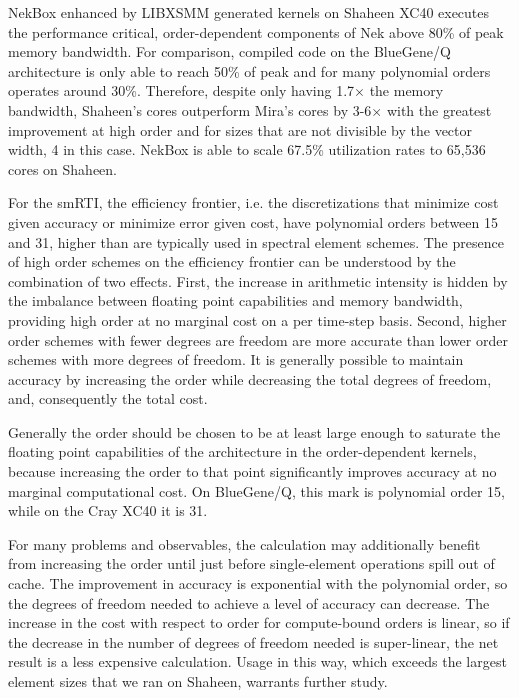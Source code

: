 NekBox enhanced by LIBXSMM generated kernels on Shaheen XC40 executes the performance critical, order-dependent components of Nek above 80\% of peak memory bandwidth.
For comparison, compiled code on the BlueGene/Q architecture is only able to
reach 50\% of peak and for many polynomial orders operates around 30\%.
Therefore, despite only having 1.7$\times$ the memory bandwidth, Shaheen's cores
outperform Mira's cores by 3-6$\times$ with the greatest improvement at high
order and for sizes that are not divisible by the vector width, 4 in this case.
NekBox is able to scale 67.5\% utilization rates to 65,536 cores on Shaheen.


For the smRTI, the efficiency frontier, i.e. the discretizations that minimize
cost given accuracy or minimize error given cost, have polynomial orders between 15 and 31, higher than are typically used in spectral element schemes.
The presence of high order schemes on the efficiency frontier can be understood by the combination of two effects.
First, the increase in arithmetic intensity is hidden by the imbalance between floating point capabilities and memory bandwidth, providing high order at no marginal cost on a per time-step basis.
Second, higher order schemes with fewer degrees are freedom are more accurate than lower order schemes with more degrees of freedom.
It is generally possible to maintain accuracy by increasing the order while decreasing the total degrees of freedom, and, consequently the total cost.

Generally the order should be chosen to be at least large enough to saturate the floating point capabilities of the architecture in the order-dependent kernels, because increasing the order to that point significantly improves accuracy at no marginal computational cost.
On BlueGene/Q, this mark is polynomial order 15, while on the Cray XC40 it is 31.

For many problems and observables, the calculation may additionally benefit from increasing the order until just before single-element operations spill out of cache.
The improvement in accuracy is exponential with the polynomial order, so the degrees of freedom needed to achieve a level of accuracy can decrease.
The increase in the cost with respect to order for compute-bound orders is linear, so if the decrease in the number of degrees of freedom needed is super-linear, the net result is a less expensive calculation.
Usage in this way, which exceeds the largest element sizes that we ran on Shaheen, warrants further study.

